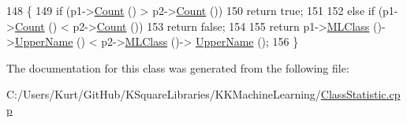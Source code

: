 \begin{DoxyCode}
148    \{
149      \textcolor{keywordflow}{if}  (p1->\hyperlink{class_k_k_m_l_l_1_1_class_statistic_ace228f15b538c012781b4f6800c837c5}{Count} () > p2->\hyperlink{class_k_k_m_l_l_1_1_class_statistic_ace228f15b538c012781b4f6800c837c5}{Count} ())
150        \textcolor{keywordflow}{return} \textcolor{keyword}{true};
151 
152      \textcolor{keywordflow}{else} \textcolor{keywordflow}{if}  (p1->\hyperlink{class_k_k_m_l_l_1_1_class_statistic_ace228f15b538c012781b4f6800c837c5}{Count} () < p2->\hyperlink{class_k_k_m_l_l_1_1_class_statistic_ace228f15b538c012781b4f6800c837c5}{Count} ())
153        \textcolor{keywordflow}{return} \textcolor{keyword}{false};
154 
155      \textcolor{keywordflow}{return}  p1->\hyperlink{class_k_k_m_l_l_1_1_class_statistic_a7f2775bca7634dd376ffe3c804e65c3e}{MLClass} ()->\hyperlink{class_k_k_m_l_l_1_1_m_l_class_a3e688259223abd20da71a18a9877fbc4}{UpperName} () < p2->\hyperlink{class_k_k_m_l_l_1_1_class_statistic_a7f2775bca7634dd376ffe3c804e65c3e}{MLClass} ()->
      \hyperlink{class_k_k_m_l_l_1_1_m_l_class_a3e688259223abd20da71a18a9877fbc4}{UpperName} ();
156    \}
\end{DoxyCode}


The documentation for this class was generated from the following file\+:\begin{DoxyCompactItemize}
\item 
C\+:/\+Users/\+Kurt/\+Git\+Hub/\+K\+Square\+Libraries/\+K\+K\+Machine\+Learning/\hyperlink{_class_statistic_8cpp}{Class\+Statistic.\+cpp}\end{DoxyCompactItemize}
